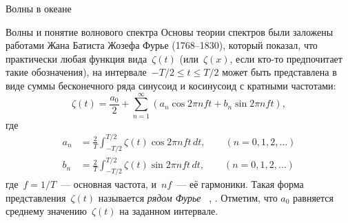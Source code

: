 \begin{chapter}{Волны в океане}
\begin{section}{Волны и понятие волнового спектра}
Основы теории спектров были заложены работами Жана Батиста Жозефа Фурье
(1768--1830), который показал, что практически любая функция вида~$\zeta(t)$ 
(или~$\zeta (x)$, если кто-то предпочитает такие обозначения), 
на интервале~$-T/2 \le t \le T/2$ может быть представлена в виде суммы
бесконечного ряда синусоид и косинусоид с кратными частотами:
\begin{equation}\label{eq:16.16}
  \zeta (t) = \frac{a_0}{2} + \sum_{n=1}^{\infty} (a_n \cos 2\pi nft + b_n \sin 2\pi nft),
\end{equation}
где
\begin{subequations}\label{eq:16.17}
\begin{align}
 a_n &= \frac{2}{T} \int_{-T/2}^{T/2} \zeta (t) \cos 2\pi nft \, dt, 
          \qquad (n=0,1,2,\ldots) \\
 b_n &= \frac{2}{T} \int_{-T/2}^{T/2} \zeta (t) \sin 2\pi nft \, dt, 
          \qquad (n=0,1,2,\ldots)
\end{align}
\end{subequations}
где~$f = 1/ T$~--- основная частота, и~$nf$~--- её гармоники. 
Такая форма представления~$\zeta (t)$ называется
\emph{рядом Фурье}~%
\cite[стр.~204]{Bracewell:1986}, \cite[\S~9.1]{Whittaker:1963}. 
Отметим, что $a_0$ равняется среднему значению~$\zeta (t)$ на заданном 
интервале.
%


\end{section}
\end{chapter}
